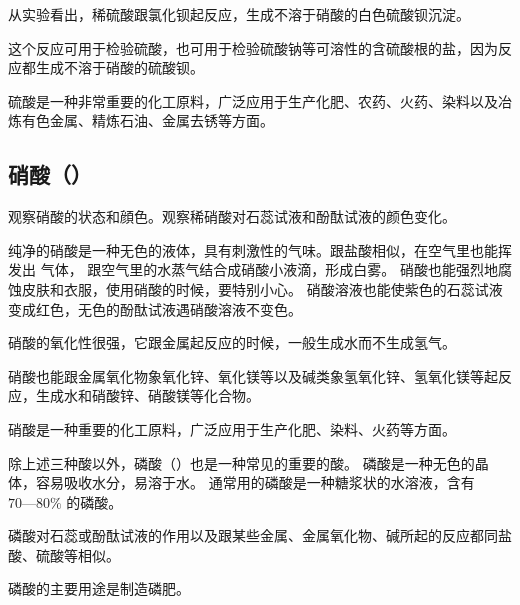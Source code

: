 从实验看出，稀硫酸跟氯化钡起反应，生成不溶于硝酸的白色硫酸钡沉淀。
\begin{fangchengshi}
\end{fangchengshi}

这个反应可用于检验硫酸，也可用于检验硫酸钠等可溶性的含硫酸根的盐，因为反应都生成不溶于硝酸的硫酸钡。
\begin{fangchengshi}
\end{fangchengshi}

硫酸是一种非常重要的化工原料，广泛应用于生产化肥、农药、火药、染料以及冶炼有色金属、精炼石油、金属去锈等方面。



\subsection{硝酸（）}

\begin{shiyan}
    观察硝酸的状态和顔色。观察稀硝酸对石蕊试液和酚酞试液的颜色变化。
\end{shiyan}

纯净的硝酸是一种无色的液体，具有刺激性的气味。跟盐酸相似，在空气里也能挥发出  气体，
跟空气里的水蒸气结合成硝酸小液滴，形成白雾。
硝酸也能强烈地腐蚀皮肤和衣服，使用硝酸的时候，要特别小心。
硝酸溶液也能使紫色的石蕊试液变成红色，无色的酚酞试液遇硝酸溶液不变色。

硝酸的氧化性很强，它跟金属起反应的时候，一般生成水而不生成氢气。

硝酸也能跟金属氧化物象氧化锌、氧化镁等以及碱类象氢氧化锌、氢氧化镁等起反应，生成水和硝酸锌、硝酸镁等化合物。

硝酸是一种重要的化工原料，广泛应用于生产化肥、染料、火药等方面。

除上述三种酸以外，磷酸（）也是一种常见的重要的酸。
磷酸是一种无色的晶体，容易吸收水分，易溶于水。
通常用的磷酸是一种糖浆状的水溶液，含有 $70—80\%$ 的磷酸。

磷酸对石蕊或酚酞试液的作用以及跟某些金属、金属氧化物、碱所起的反应都同盐酸、硫酸等相似。

磷酸的主要用途是制造磷肥。


